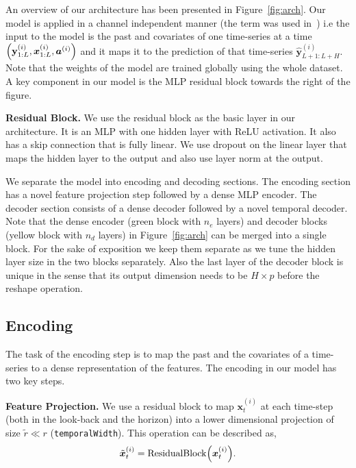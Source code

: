 \documentclass[10pt]{article} \usepackage[accepted]{tmlr}
\theoremstyle{plain}
\theoremstyle{definition}
\theoremstyle{remark}
\newcommand{\ab}{{\bm{a}}}
\newcommand{\xb}{{\bm{x}}}
\newcommand{\ba}{\ab}
\newcommand{\bx}{\xb}
\let\originalleft\left
\let\originalright\right
\renewcommand{\left}{\mathopen{}\mathclose\bgroup\originalleft}
\renewcommand{\right}{\aftergroup\egroup\originalright}
\def\*#1{\mathbf{#1}}
\begin{document}
An overview of our architecture has been presented in Figure~\ref{fig:arch}. Our model is applied in a channel independent manner (the term was used in~\citep{nie2022time}) i.e the input to the model is the past and covariates of one time-series at a time $\left(\*y^{(i)}_{1: L}, \bx^{(i)}_{1:L}, \ba^{(i)}\right)$ and it maps it to the prediction of that time-series $\hat{\*y}^{(i)}_{L+1: L+H}$. Note that the weights of the model are trained globally using the whole dataset. A key component in our model is the MLP residual block towards the right of the figure. 

{\bf Residual Block.} We use the residual block as the basic layer in our architecture. It is an MLP with one hidden layer with ReLU activation. It also has a skip connection that is fully linear. We use dropout on the linear layer that maps the hidden layer to the output and also use layer norm at the output.

We separate the model into encoding and decoding sections. The encoding section has a novel feature projection step followed by a dense MLP encoder. The decoder section consists of a dense decoder followed by a novel temporal decoder. Note that the dense encoder (green block with $n_e$ layers) and decoder blocks (yellow block with $n_d$ layers) in Figure~\ref{fig:arch} can be merged into a single block. For the sake of exposition we keep them separate as we tune the hidden layer size in the two blocks separately. Also the last layer of the decoder block is unique in the sense that its output dimension needs to be $H \times p$ before the reshape operation. 

\subsection{Encoding}
\label{sec:encoder}

The task of the encoding step is to map the past and the covariates of a time-series to a dense representation of the features. The encoding in our model has two key steps.

{\bf Feature Projection.} We use a residual block to map $\bx^{(i)}_t$ at each time-step (both in the look-back and the horizon) into a lower dimensional projection of size $\tilde{r} \ll r$ (\texttt{temporalWidth}). This operation can be described as,
\begin{align}
    \tilde{\bx}^{(i)}_t = \mathrm{ResidualBlock} \left( \bx^{(i)}_t\right).
\end{align}
\end{document}
